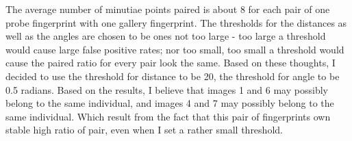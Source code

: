 \documentclass[a4paper]{article}
\begin{document}
\begin{spacing}{2.0}
	The average number of minutiae points paired is about 8 for each pair of one probe fingerprint with one gallery fingerprint. The thresholds for the distances as well as the angles are chosen to be ones not too large - too large a threshold would cause large false positive rates; nor too small, too small a threshold would cause the paired ratio for every pair look the same. Based on these thoughts, I decided to use the threshold for distance to be 20, the threshold for angle to be 0.5 radians.
	Based on the results, I believe that images 1 and 6 may possibly belong to the same individual, and images 4 and 7 may possibly belong to the same individual. Which result from the fact that this pair of fingerprints own stable high ratio of pair, even when I set a rather small threshold.
	
	 
	
  

	
	
	
	
	

	
\end{spacing}
\end{document}
